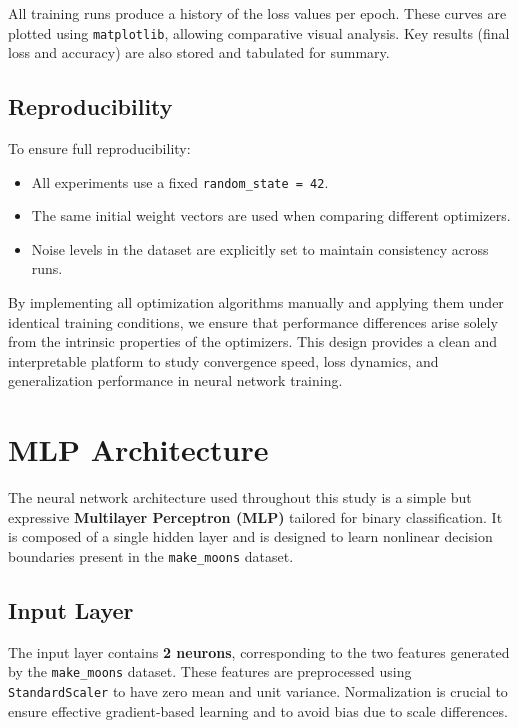 \documentclass[12pt]{article}
\begin{document}
All training runs produce a history of the loss values per epoch. These curves are plotted using \texttt{matplotlib}, allowing comparative visual analysis. Key results (final loss and accuracy) are also stored and tabulated for summary.

\subsection{Reproducibility}

To ensure full reproducibility:
\begin{itemize}
    \item All experiments use a fixed \texttt{random\_state = 42}.
    \item The same initial weight vectors are used when comparing different optimizers.
    \item Noise levels in the dataset are explicitly set to maintain consistency across runs.
\end{itemize}



\newpage
By implementing all optimization algorithms manually and applying them under identical training conditions, we ensure that performance differences arise solely from the intrinsic properties of the optimizers. This design provides a clean and interpretable platform to study convergence speed, loss dynamics, and generalization performance in neural network training.

\section{MLP Architecture}

The neural network architecture used throughout this study is a simple but expressive \textbf{Multilayer Perceptron (MLP)} tailored for binary classification. It is composed of a single hidden layer and is designed to learn nonlinear decision boundaries present in the \texttt{make\_moons} dataset.

\subsection{Input Layer}

The input layer contains \textbf{2 neurons}, corresponding to the two features generated by the \texttt{make\_moons} dataset. These features are preprocessed using \texttt{StandardScaler} to have zero mean and unit variance. Normalization is crucial to ensure effective gradient-based learning and to avoid bias due to scale differences.
\end{document}
